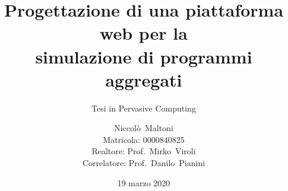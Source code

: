 \documentclass[
  usepdftitle=false,
  bigger,
  lualatex,
  italian
]{beamer}
\title[WebProtelis]{%
  Progettazione di una piattaforma web per la\\simulazione di programmi aggregati%
}
\subtitle{Tesi in Pervasive Computing}
\author[Niccolò~Maltoni (0000840825)]{%
  Niccolò~Maltoni%
  \\\small{Matricola: 0000840825}%
  \\\vspace{10pt} \small{Realtore: Prof.~Mirko~Viroli \\Correlatore: Prof.~Danilo~Pianini}
}
\institute[]{%
  Alma Mater Studiorum - Università di Bologna\\%
  Campus di Cesena%
}
\date{19 marzo 2020}
\begin{document}
  \frame{\titlepage}

  
  
  
  
\end{document}

